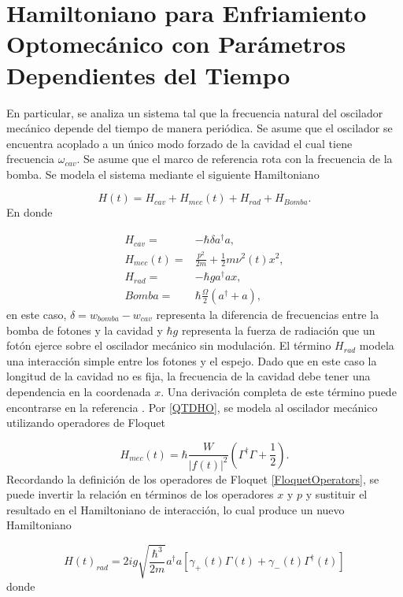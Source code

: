 \documentclass[10pt,a4paper]{report}
\begin{document}
\section{Hamiltoniano para Enfriamiento Optomecánico con Parámetros Dependientes del Tiempo}

En particular, se analiza un sistema tal que la frecuencia natural del oscilador mecánico depende del tiempo de manera periódica. Se asume que el oscilador se encuentra acoplado a un único modo forzado de la cavidad el cual tiene frecuencia $\omega_{cav}$. Se asume que el marco de referencia rota con la frecuencia de la bomba. Se modela el sistema mediante el siguiente Hamiltoniano\cite{BarberisLC}

\begin{equation}
H(t) = H_{cav} + H_{mec}(t) + H_{rad} + H_{Bomba}.
\end{equation} En donde

\begin{align}
H_{cav} =& -\hbar \delta a^\dagger a,\\
H_{mec}(t) =& \frac{p^2}{2m} + \frac{1}{2}m \nu^2 (t) x^2,\\
H_{rad} =& -\hbar g a^\dagger a x,\\
Bomba =& \hbar\frac{\Omega}{2}(a^\dagger + a),
\end{align} en este caso, $\delta = w_{bomba} - w_{cav}$ representa la diferencia de frecuencias entre la bomba de fotones y la cavidad y $\hbar g$ representa la fuerza de radiación que un fotón ejerce sobre el oscilador mecánico sin modulación. El término $H_{rad}$ modela una interacción simple entre los fotones y el espejo. Dado que en este caso la longitud de la cavidad no es fija, la frecuencia de la cavidad debe tener una dependencia en la coordenada $x$. Una derivación completa de este término puede encontrarse en la referencia \cite{KippenberCO}. Por \eqref{QTDHO}, se modela al oscilador mecánico utilizando operadores de Floquet

\begin{equation}
H_{mec}(t) = \hbar\frac{W}{|f(t)|^2}(\Gamma^\dagger \Gamma + \frac{1}{2}).
\end{equation} Recordando la definición de los operadores de Floquet \eqref{FloquetOperators}, se puede invertir la relación en términos de los operadores $x$ y $p$ y sustituir el resultado en el Hamiltoniano de interacción, lo cual produce un nuevo Hamiltoniano\cite{TesisMaestria}

\begin{equation}
H(t)_{rad} = 2ig\sqrt{\frac{\hbar^3}{2m}}  a^\dagger a[\gamma_+(t)\Gamma (t) +\gamma_-(t)\Gamma^\dagger (t)]
\end{equation} donde
\end{document}
